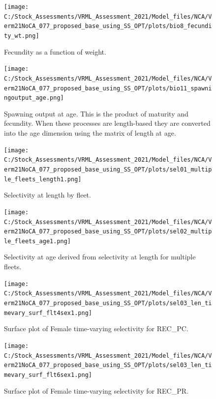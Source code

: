 \documentclass[11pt,
  english,
  a4paper,
]{article}
\begin{document}
\begin{figure}
\centering
\texttt{[image: C:/Stock\_Assessments/VRML\_Assessment\_2021/Model\_files/NCA/Verm21NoCA\_077\_proposed\_base\_using\_SS\_OPT/plots/bio8\_fecundity\_wt.png]}
\caption{Fecundity as a function of weight.\label{fig:fecundity}}
\end{figure}

\begin{figure}
\centering
\texttt{[image: C:/Stock\_Assessments/VRML\_Assessment\_2021/Model\_files/NCA/Verm21NoCA\_077\_proposed\_base\_using\_SS\_OPT/plots/bio11\_spawningoutput\_age.png]}
\caption{Spawning output at age. This is the product of maturity and fecundity. When these processes are length-based they are converted into the age dimension using the matrix of length at age.\label{fig:spawningoutputage}}
\end{figure}

\FloatBarrier

\FloatBarrier

\begin{figure}
\centering
\texttt{[image: C:/Stock\_Assessments/VRML\_Assessment\_2021/Model\_files/NCA/Verm21NoCA\_077\_proposed\_base\_using\_SS\_OPT/plots/sel01\_multiple\_fleets\_length1.png]}
\caption{Selectivity at length by fleet.\label{fig:selex-length-all}}
\end{figure}

\FloatBarrier

\begin{figure}
\centering
\texttt{[image: C:/Stock\_Assessments/VRML\_Assessment\_2021/Model\_files/NCA/Verm21NoCA\_077\_proposed\_base\_using\_SS\_OPT/plots/sel02\_multiple\_fleets\_age1.png]}
\caption{Selectivity at age derived from selectivity at length for multiple fleets.\label{fig:selex-age-all}}
\end{figure}

\begin{figure}
\centering
\texttt{[image: C:/Stock\_Assessments/VRML\_Assessment\_2021/Model\_files/NCA/Verm21NoCA\_077\_proposed\_base\_using\_SS\_OPT/plots/sel03\_len\_timevary\_surf\_flt4sex1.png]}
\caption{Surface plot of Female time-varying selectivity for REC\_PC.\label{fig:sel03_len_timevary_surf_flt4sex1}}
\end{figure}

\begin{figure}
\centering
\texttt{[image: C:/Stock\_Assessments/VRML\_Assessment\_2021/Model\_files/NCA/Verm21NoCA\_077\_proposed\_base\_using\_SS\_OPT/plots/sel03\_len\_timevary\_surf\_flt6sex1.png]}
\caption{Surface plot of Female time-varying selectivity for REC\_PR.\label{fig:sel03_len_timevary_surf_flt6sex1}}
\end{figure}
\end{document}
